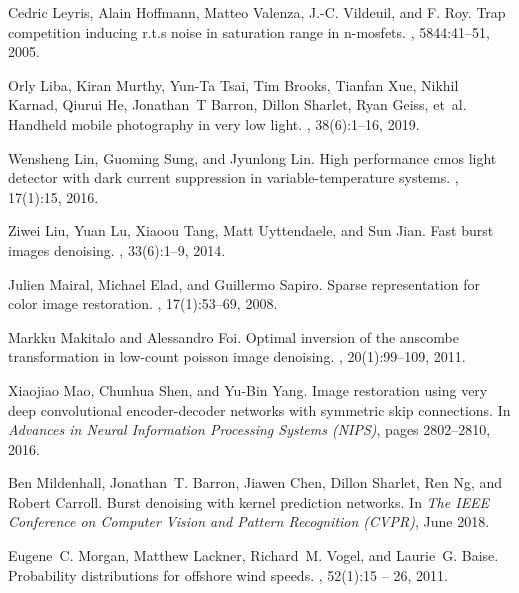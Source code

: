 \documentclass[10pt,twocolumn,letterpaper]{article}
\begin{document}
\begin{thebibliography}{10}
Cedric Leyris, Alain Hoffmann, Matteo Valenza, J.-C. Vildeuil, and F. Roy.
\newblock Trap competition inducing r.t.s noise in saturation range in
  n-mosfets.
, 5844:41--51, 2005.

Orly Liba, Kiran Murthy, Yun-Ta Tsai, Tim Brooks, Tianfan Xue, Nikhil Karnad,
  Qiurui He, Jonathan~T Barron, Dillon Sharlet, Ryan Geiss, et~al.
\newblock Handheld mobile photography in very low light.
, 38(6):1--16, 2019.

Wensheng Lin, Guoming Sung, and Jyunlong Lin.
\newblock High performance cmos light detector with dark current suppression in
  variable-temperature systems.
, 17(1):15, 2016.

Ziwei Liu, Yuan Lu, Xiaoou Tang, Matt Uyttendaele, and Sun Jian.
\newblock Fast burst images denoising.
, 33(6):1--9, 2014.

Julien Mairal, Michael Elad, and Guillermo Sapiro.
\newblock Sparse representation for color image restoration.
, 17(1):53--69, 2008.

Markku Makitalo and Alessandro Foi.
\newblock Optimal inversion of the anscombe transformation in low-count poisson
  image denoising.
, 20(1):99--109, 2011.

Xiaojiao Mao, Chunhua Shen, and Yu-Bin Yang.
\newblock Image restoration using very deep convolutional encoder-decoder
  networks with symmetric skip connections.
\newblock In {\em Advances in Neural Information Processing Systems (NIPS)},
  pages 2802--2810, 2016.

Ben Mildenhall, Jonathan~T. Barron, Jiawen Chen, Dillon Sharlet, Ren Ng, and
  Robert Carroll.
\newblock Burst denoising with kernel prediction networks.
\newblock In {\em The IEEE Conference on Computer Vision and Pattern
  Recognition (CVPR)}, June 2018.

Eugene~C. Morgan, Matthew Lackner, Richard~M. Vogel, and Laurie~G. Baise.
\newblock Probability distributions for offshore wind speeds.
, 52(1):15 -- 26, 2011.


\end{thebibliography}
\end{document}
